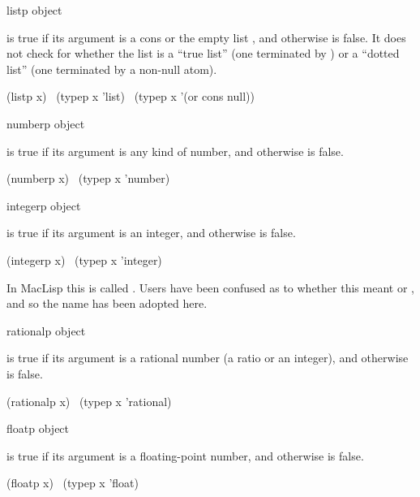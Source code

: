 \begin{defun}[Function]
listp object

 is true if its argument is a cons or the empty list {\emptylist},
and otherwise is false.  It does not check for whether the list
is a ``true list'' (one terminated by {\nil}) or a ``dotted list''
(one terminated by a non-null atom).
\begin{lisp}
(listp x) \EQ\ (typep x 'list) \EQ\ (typep x '(or cons null))
\end{lisp}
\end{defun}

\begin{defun}[Function]
numberp object

 is true if its argument is any kind of number,
and otherwise is false.
\begin{lisp}
(numberp x) \EQ\ (typep x 'number)
\end{lisp}
\end{defun}

\begin{defun}[Function]
integerp object

 is true if its argument is an integer, and otherwise
is false.
\begin{lisp}
(integerp x) \EQ\ (typep x 'integer)
\end{lisp}

\beforenoterule
\begin{incompatibility}
In MacLisp this is called .
Users have been confused as to whether this meant 
or , and so the name  has been adopted here.
\end{incompatibility}
\afternoterule
\end{defun}

\begin{defun}[Function]
rationalp object

 is true if its argument is a rational number (a ratio or
an integer), and otherwise is false.
\begin{lisp}
(rationalp x) \EQ\ (typep x 'rational)
\end{lisp}
\end{defun}

\begin{defun}[Function]
floatp object

 is true if its argument is a floating-point number,
and otherwise is false.
\begin{lisp}
(floatp x) \EQ\ (typep x 'float)
\end{lisp}
\end{defun}


